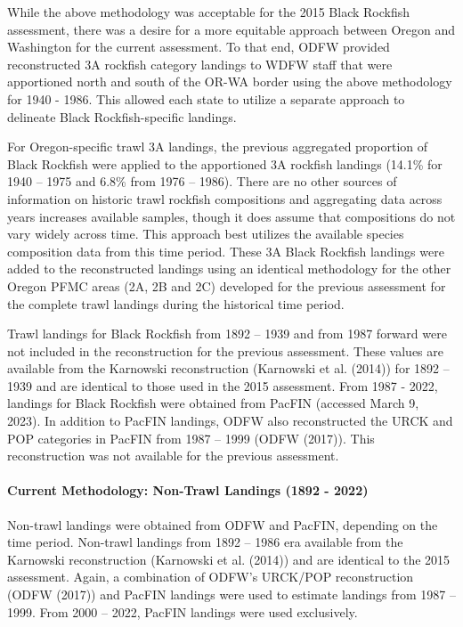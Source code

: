 \documentclass[11pt,
  english,
  letterpaper,
]{article}
\begin{document}
While the above methodology was acceptable for the 2015 Black Rockfish assessment, there was a desire for a more equitable approach between Oregon and Washington for the current assessment. To that end, ODFW provided reconstructed 3A rockfish category landings to WDFW staff that were apportioned north and south of the OR-WA border using the above methodology for 1940 - 1986. This allowed each state to utilize a separate approach to delineate Black Rockfish-specific landings.

For Oregon-specific trawl 3A landings, the previous aggregated proportion of Black Rockfish were applied to the apportioned 3A rockfish landings (14.1\% for 1940 -- 1975 and 6.8\% from 1976 -- 1986). There are no other sources of information on historic trawl rockfish compositions and aggregating data across years increases available samples, though it does assume that compositions do not vary widely across time. This approach best utilizes the available species composition data from this time period. These 3A Black Rockfish landings were added to the reconstructed landings using an identical methodology for the other Oregon PFMC areas (2A, 2B and 2C) developed for the previous assessment for the complete trawl landings during the historical time period.

Trawl landings for Black Rockfish from 1892 -- 1939 and from 1987 forward were not included in the reconstruction for the previous assessment. These values are available from the Karnowski reconstruction (Karnowski et al. (2014)) for 1892 -- 1939 and are identical to those used in the 2015 assessment. From 1987 - 2022, landings for Black Rockfish were obtained from PacFIN (accessed March 9, 2023). In addition to PacFIN landings, ODFW also reconstructed the URCK and POP categories in PacFIN from 1987 -- 1999 (ODFW (2017)). This reconstruction was not available for the previous assessment.

\hypertarget{current-methodology-non-trawl-landings-1892---2022}{%
\paragraph{Current Methodology: Non-Trawl Landings (1892 - 2022)}\label{current-methodology-non-trawl-landings-1892---2022}}

Non-trawl landings were obtained from ODFW and PacFIN, depending on the time period. Non-trawl landings from 1892 -- 1986 era available from the Karnowski reconstruction (Karnowski et al. (2014)) and are identical to the 2015 assessment. Again, a combination of ODFW's URCK/POP reconstruction (ODFW (2017)) and PacFIN landings were used to estimate landings from 1987 -- 1999. From 2000 -- 2022, PacFIN landings were used exclusively.
\end{document}
